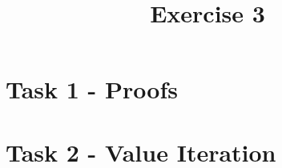 \documentclass[a4paper]{article}
\date{}
\author{}
\title{\textbf{Exercise 3}}
\begin{document}
\maketitle 
\thispagestyle{fancy}

\section*{Task 1 - Proofs}

\section*{Task 2 - Value Iteration}
\end{document}
